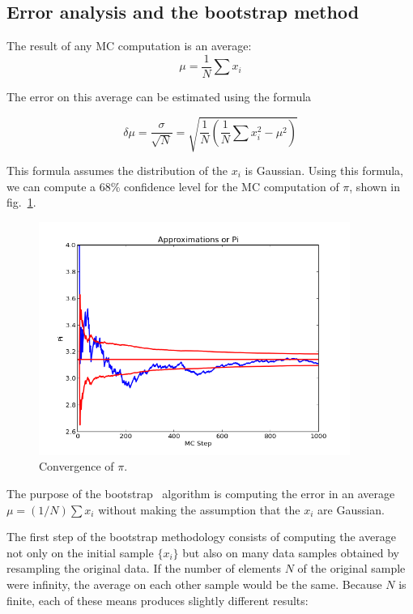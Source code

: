 \documentclass[justified,sixbynine]{tufte-book}
\theoremstyle{plain}%
\theoremstyle{definition}
\theoremstyle{remark}
\begin{document}
\begin{fullwidth}
\section{Error analysis and the bootstrap method}

The result of any MC computation is an average:
\begin{equation}
\mu = \frac1N \sum x_i
\end{equation}

The error on this average can be estimated using the formula

\begin{equation}
\delta\mu = \frac{\sigma}{\sqrt{N}} = \sqrt{\frac1{N} \left( {\frac1N \sum x^2_i - \mu^2} \right)}
\end{equation}

This formula assumes the distribution of the $x_i$ is Gaussian. Using this formula, we can compute a 68\% confidence level for the MC computation of $\pi$, shown in fig.~\ref{pi-plot2}.

\begin{figure}[ht]
\centering\includegraphics[width=4in]{images/pi2.png}
\caption{Convergence of $\pi$\label{pi-plot2}.}
\end{figure}


The purpose of the bootstrap~\cite{bootstrap} algorithm is computing the error in an average $\mu = (1/N) \sum x_i$ without making the assumption that the $x_i$ are Gaussian.

The first step of the bootstrap methodology consists of computing the average not only on the initial sample $\{x_i\}$ but also on many data samples obtained by resampling the original data. If the number of elements $N$ of the original sample were infinity, the average on each other sample would be the same. Because $N$ is finite, each of these means produces slightly different results:


\end{fullwidth}
\end{document}

